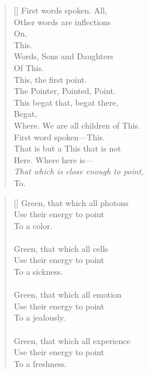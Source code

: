 \documentclass{article}
\begin{document}
\settowidth{\versewidth}{Than Tycho Brahe, or Erra Pater:}
\begin{verse}[\versewidth]
First words spoken. All, \\
Other words are inflections \\
On, \\
This. \\
Words, Sons and Daughters \\
Of This. \\
This, the first point. \\
The Pointer, Pointed, Point. \\
This begat that, begat there, \\
Begat, \\
Where. We are all children of This. \\
First word spoken––This. \\
That is but a This that is not \\
Here. Where here is–– \\
\textit{That which is close enough to point,} \\
To. \\
\end{verse}

\settowidth{\versewidth}{Than Tycho Brahe, or Erra Pater:}
\begin{verse}[\versewidth]
Green, that which all photons \\
Use their energy to point \\
To a color. \\ 
\\
Green, that which all cells \\
Use their energy to point \\
To a sickness. \\ 
\\
Green, that which all emotion \\
Use their energy to point \\
To a jealously. \\
\\
Green, that which all experience \\
Use their energy to point \\
To a freshness. \\
\end{verse}
\newpage
\end{document}
